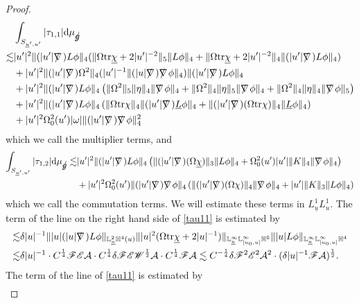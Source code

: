 \documentclass[11pt,reqno]{amsart}
\theoremstyle{definition}
\numberwithin{equation}{section}
\newcommand{\D}{\mathrm{d}}
\newcommand{\tr}{\mathrm{tr}}
\renewcommand{\L}{\mathbb{L}}
\renewcommand{\H}{\mathbb{H}}
\def\chib{\underline{\chi}}
\def\Lb{\underline{L}}
\def\tr{\mathrm{tr}}
\def\ub{\underline{u}}
\def\nablas{\mbox{$\nabla \mkern -13mu /$ }}
\def\gs{\mbox{$g \mkern -9mu /$}}
\begin{document}
\begin{proof}
\begin{equation}
\begin{split}
&\int_{S_{\ub',u'}}|\tau_{1,1}|\D\mu_{\gs}\\
\lesssim&|u'|^2\|(|u'|\nablas)L\phi\|_4(\|\Omega\tr\chib+2|u'|^{-2}\|_5\|L\phi\|_4+\|\Omega\tr\chib+2|u'|^{-2}\|_4\|(|u'|\nablas)L\phi\|_4)\\
&+|u'|^2\|(|u'|\nablas)\Omega^2\|_4(|u'|^{-1}\|(|u|\nablas)\nablas\phi\|_4)\|(|u'|\nablas)L\phi\|_4\\&+|u'|^2\|(|u'|\nablas)L\phi\|_4\left(\|\Omega^2\|_5\|\eta\|_4\|\nablas\phi\|_4+\|\Omega^2\|_4\|\eta\|_5\|\nablas\phi\|_4+\|\Omega^2\|_4\|\eta\|_4\|\nablas\phi\|_5\right)\\
&+|u'|^2\|(|u'|\nablas)L\phi\|_4\left(\|\Omega\tr\chi\|_4\|(|u'|\nablas)\Lb\phi\|_4+\|(|u'|\nablas)(\Omega\tr\chi)\|_4\|\Lb\phi\|_4\right)\\
&+|u'|^2\Omega_0^2(u')|\omega|\|(|u'|\nablas)\nablas\phi\|_4^2
\end{split}
\end{equation}
which we call the multiplier terms, and
\begin{equation}\label{tau12}
\begin{split}
\int_{S_{\ub',u'}}|\tau_{1,2}|\D\mu_{\gs}\lesssim&|u'|^2\|(|u'|\nablas)L\phi\|_4\left(\|(|u'|\nablas)(\Omega\chib)\|_3\|L\phi\|_4+\Omega_0^2(u')|u'|\|K\|_4\|\nablas\phi\|_4\right)\\
&+|u'|^2\Omega_0^2(u')\|(|u'|\nablas)\nablas\phi\|_4\left(\|(|u'|\nablas)(\Omega\chi)\|_4\|\nablas\phi\|_4+|u'|\|K\|_3\|L\phi\|_4\right)
\end{split}
\end{equation}
which we call the commutation terms. We will estimate these terms in $L^1_{\ub}L^1_{u}$. The  term of the  line on the right hand side of \eqref{tau11} is estimated by
\begin{align*}
\lesssim& \delta|u|^{-1}\||u|(|u|\nablas)L\phi\|_{\L^2_{\ub}\H^4(u)}\||u|^2(\Omega\tr\chib+2|u|^{-1})\|_{\L^\infty_{\ub}\L^\infty_{[u_0,u]}\H^5}\||u|L\phi\|_{\L^\infty_{\ub}\L^\infty_{[u_0,u]}\H^4}\\
\lesssim&\delta|u|^{-1}\cdot C^{\frac{1}{4}}\mathscr{F}\mathscr{E}\mathcal{A}\cdot C^{\frac{1}{4}}\delta\mathscr{F}\mathscr{E}\mathscr{W}^{\frac{1}{2}}\mathcal{A}\cdot C^{\frac{1}{4}}\mathscr{F}\mathcal{A}
\lesssim C^{-\frac{1}{4}}\delta\mathscr{F}^2\mathscr{E}^2\mathcal{A}^2\cdot(\delta|u|^{-1}\mathscr{F}\mathcal{A})^{\frac{1}{2}}.
\end{align*}
The  term of the  line of \eqref{tau11} is estimated by
\begin{align*}

\end{align*}
\end{proof}
\end{document}
